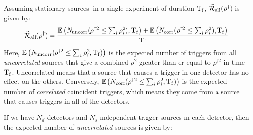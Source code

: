 Assuming stationary sources, in a single experiment of duration $\mathrm{T_f}$, $\widetilde{\mathcal{R}}_\mathrm{all}(\rho^\dagger)$ is given by:
\begin{equation}
\label{eqn:rate_param}
\widetilde{\RP}_{\mathrm{all}}(\rho^\dagger) = \frac{\Exptd\left(N_{\mathrm{uncorr}}(\rho^{\dagger2} \leq \sum_i\rho_i^2),\Tf\right) + \Exptd\left(N_{\mathrm{corr}}(\rho^{\dagger2} \leq \sum_i\rho_i^2),\Tf\right)}{\Tf}
\end{equation}
Here, $\mathbb{E}\left(N_{\mathrm{uncorr}}(\rho^{\dagger2} \leq \sum_i\rho_i^2, \mathrm{T_f})\right)$ is the expected number of triggers from all \emph{uncorrelated} sources that give a combined $\rho^2$ greater than or equal to $\rho^{\dagger2}$ in time $\mathrm{T_f}$. Uncorrelated means that a source that causes a trigger in one detector has no effect on the others. Conversely, $\mathbb{E}\left(N_{\mathrm{corr}}(\rho^{\dagger2} \leq \sum_i\rho_i^2, \mathrm{T_f})\right)$ is the expected number of \emph{correlated} coincident triggers, which means they come from a source that causes triggers in all of the detectors.

If we have $N_d$ detectors and $N_s$ independent trigger sources in each detector, then the expected number of \emph{uncorrelated} sources is given by:

